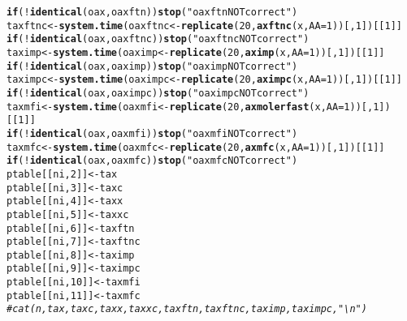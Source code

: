 \documentclass[10pt]{article}\usepackage[]{graphicx}\usepackage[]{color}
\makeatletter
\newcommand{\hlnum}[1]{\textcolor[rgb]{0.686,0.059,0.569}{#1}}%
\newcommand{\hlstr}[1]{\textcolor[rgb]{0.192,0.494,0.8}{#1}}%
\newcommand{\hlcom}[1]{\textcolor[rgb]{0.678,0.584,0.686}{\textit{#1}}}%
\newcommand{\hlopt}[1]{\textcolor[rgb]{0,0,0}{#1}}%
\newcommand{\hlstd}[1]{\textcolor[rgb]{0.345,0.345,0.345}{#1}}%
\newcommand{\hlkwa}[1]{\textcolor[rgb]{0.161,0.373,0.58}{\textbf{#1}}}%
\newcommand{\hlkwb}[1]{\textcolor[rgb]{0.69,0.353,0.396}{#1}}%
\newcommand{\hlkwc}[1]{\textcolor[rgb]{0.333,0.667,0.333}{#1}}%
\newcommand{\hlkwd}[1]{\textcolor[rgb]{0.737,0.353,0.396}{\textbf{#1}}}%
\newenvironment{kframe}{%
 \def\at@end@of@kframe{}%
 \ifinner\ifhmode%
  \def\at@end@of@kframe{\end{minipage}}%
  \begin{minipage}{\columnwidth}%
 \fi\fi%
 \def\FrameCommand##1{\hskip\@totalleftmargin \hskip-\fboxsep
 \colorbox{shadecolor}{##1}\hskip-\fboxsep
     \hskip-\linewidth \hskip-\@totalleftmargin \hskip\columnwidth}%
 \MakeFramed {\advance\hsize-\width
   \@totalleftmargin\z@ \linewidth\hsize
   \@setminipage}}%
 {\par\unskip\endMakeFramed%
 \at@end@of@kframe}
\newenvironment{knitrout}{}{} %
\makeatother
\begin{document}
\begin{knitrout}
\begin{kframe}
\begin{alltt}
  \hlkwa{if} \hlstd{(}\hlopt{!} \hlkwd{identical}\hlstd{(oax, oaxftn))} \hlkwd{stop}\hlstd{(}\hlstr{"oaxftn NOT correct"}\hlstd{)}
  \hlstd{taxftnc}\hlkwb{<-}\hlkwd{system.time}\hlstd{(oaxftnc}\hlkwb{<-}\hlkwd{replicate}\hlstd{(}\hlnum{20}\hlstd{,}\hlkwd{axftnc}\hlstd{(x,} \hlkwc{AA}\hlstd{=}\hlnum{1}\hlstd{))[,}\hlnum{1}\hlstd{])[[}\hlnum{1}\hlstd{]]}
  \hlkwa{if} \hlstd{(}\hlopt{!} \hlkwd{identical}\hlstd{(oax, oaxftnc))} \hlkwd{stop}\hlstd{(}\hlstr{"oaxftnc NOT correct"}\hlstd{)}
  \hlstd{taximp}\hlkwb{<-}\hlkwd{system.time}\hlstd{(oaximp}\hlkwb{<-}\hlkwd{replicate}\hlstd{(}\hlnum{20}\hlstd{,}\hlkwd{aximp}\hlstd{(x,} \hlkwc{AA}\hlstd{=}\hlnum{1}\hlstd{))[,}\hlnum{1}\hlstd{])[[}\hlnum{1}\hlstd{]]}
  \hlkwa{if} \hlstd{(}\hlopt{!} \hlkwd{identical}\hlstd{(oax, oaximp))} \hlkwd{stop}\hlstd{(}\hlstr{"oaximp NOT correct"}\hlstd{)}
  \hlstd{taximpc}\hlkwb{<-}\hlkwd{system.time}\hlstd{(oaximpc}\hlkwb{<-}\hlkwd{replicate}\hlstd{(}\hlnum{20}\hlstd{,}\hlkwd{aximpc}\hlstd{(x,} \hlkwc{AA}\hlstd{=}\hlnum{1}\hlstd{))[,}\hlnum{1}\hlstd{])[[}\hlnum{1}\hlstd{]]}
  \hlkwa{if} \hlstd{(}\hlopt{!} \hlkwd{identical}\hlstd{(oax, oaximpc))} \hlkwd{stop}\hlstd{(}\hlstr{"oaximpc NOT correct"}\hlstd{)}
  \hlstd{taxmfi}\hlkwb{<-}\hlkwd{system.time}\hlstd{(oaxmfi}\hlkwb{<-}\hlkwd{replicate}\hlstd{(}\hlnum{20}\hlstd{,}\hlkwd{axmolerfast}\hlstd{(x,} \hlkwc{AA}\hlstd{=}\hlnum{1}\hlstd{))[,}\hlnum{1}\hlstd{])[[}\hlnum{1}\hlstd{]]}
  \hlkwa{if} \hlstd{(}\hlopt{!} \hlkwd{identical}\hlstd{(oax, oaxmfi))} \hlkwd{stop}\hlstd{(}\hlstr{"oaxmfi NOT correct"}\hlstd{)}
  \hlstd{taxmfc}\hlkwb{<-}\hlkwd{system.time}\hlstd{(oaxmfc}\hlkwb{<-}\hlkwd{replicate}\hlstd{(}\hlnum{20}\hlstd{,}\hlkwd{axmfc}\hlstd{(x,} \hlkwc{AA}\hlstd{=}\hlnum{1}\hlstd{))[,}\hlnum{1}\hlstd{])[[}\hlnum{1}\hlstd{]]}
  \hlkwa{if} \hlstd{(}\hlopt{!} \hlkwd{identical}\hlstd{(oax, oaxmfc))} \hlkwd{stop}\hlstd{(}\hlstr{"oaxmfc NOT correct"}\hlstd{)}
  \hlstd{ptable[[ni,} \hlnum{2}\hlstd{]]}\hlkwb{<-}\hlstd{tax}
  \hlstd{ptable[[ni,} \hlnum{3}\hlstd{]]}\hlkwb{<-}\hlstd{taxc}
  \hlstd{ptable[[ni,} \hlnum{4}\hlstd{]]}\hlkwb{<-}\hlstd{taxx}
  \hlstd{ptable[[ni,} \hlnum{5}\hlstd{]]}\hlkwb{<-}\hlstd{taxxc}
  \hlstd{ptable[[ni,} \hlnum{6}\hlstd{]]}\hlkwb{<-}\hlstd{taxftn}
  \hlstd{ptable[[ni,} \hlnum{7}\hlstd{]]}\hlkwb{<-}\hlstd{taxftnc}
  \hlstd{ptable[[ni,} \hlnum{8}\hlstd{]]}\hlkwb{<-}\hlstd{taximp}
  \hlstd{ptable[[ni,} \hlnum{9}\hlstd{]]}\hlkwb{<-}\hlstd{taximpc}
  \hlstd{ptable[[ni,} \hlnum{10}\hlstd{]]}\hlkwb{<-}\hlstd{taxmfi}
  \hlstd{ptable[[ni,} \hlnum{11}\hlstd{]]}\hlkwb{<-}\hlstd{taxmfc}
\hlcom{#  cat(n,tax, taxc, taxx, taxxc, taxftn, taxftnc, taximp, taximpc,"\textbackslash{}n")}

\end{alltt}
\end{kframe}
\end{knitrout}
\end{document}
